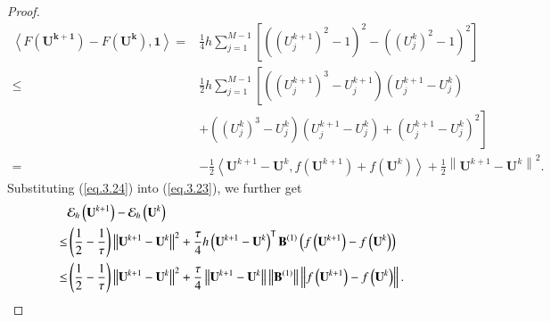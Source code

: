 \documentclass{siamart171218}
\numberwithin{theorem}{section}
\numberwithin{equation}{section}
\begin{document}
\begin{proof}
\begin{equation}
\begin{aligned}\displaystyle
\left<
F\left(\mathbf{U^{k+1}}\right)-
F\left(\mathbf{U^{k}}\right),\mathbf{1}\right>
=&\frac{1}{4}h\sum_{j=1}^{M-1}\left[
\left(\left(U^{k+1}_j\right)^2-
1\right)^2-\left(\left(U^{k}_j\right)^2-
1\right)^2
\right]
\\
\leq&\frac{1}{2}h\sum_{j=1}^{M-1}\left[
\left(\left(U^{k+1}_j\right)^3-
U^{k+1}_j\right)\left(U^{k+1}_j-
U^{k}_j\right)\right.\\&\left.
+\left(\left(U^{k}_j\right)^3-
U^{k}_j\right)\left(U^{k+1}_j-
U^{k}_j\right)
+\left(U^{k+1}_j-
U^{k}_j\right)^2
\right]\\
=&-\frac{1}{2}\left<\mathbf{U}^{k+1}-\mathbf{U}^k,
f\left(\mathbf{U}^{k+1}\right)+f\left(\mathbf{U}^{k}\right)\right>
+\frac{1}{2}\left\|\mathbf{U}^{k+1}-
\mathbf{U}^{k}\right\|^2.
\end{aligned}
\end{equation}
Substituting (\ref{eq.3.24}) into (\ref{eq.3.23}), we further get
 \begin{equation}\label{eq.3.25}
\begin{aligned}\displaystyle
&{\mathcal{E}}_h\left(\mathbf{U}^{k+1}\right)-{\mathcal{E}}_h\left(\mathbf{U}^k\right)\\
\leq&
\left(\frac{1}{2}-\frac{1}{\tau}\right)\left\|\mathbf{U}^{k+1}-\mathbf{U}^k\right\|^2
+\frac{\tau}{4} h\left(\mathbf{U}^{k+1}
-\mathbf{U}^k\right)^{\mathsf{T}}\mathbf{B}^{(1)}\left(
 f\left(\mathbf{U}^{k+1}\right)- f\left(\mathbf{U}^{k}\right)\right) \\
 \leq&
\left(\frac{1}{2}-\frac{1}{\tau}\right)\left\|\mathbf{U}^{k+1}-\mathbf{U}^k\right\|^2
+\frac{\tau}{4} \left\|\mathbf{U}^{k+1}
-\mathbf{U}^k\right\|\left\|\mathbf{B}^{(1)}\right\|\left\|
 f\left(\mathbf{U}^{k+1}\right)- f\left(\mathbf{U}^{k}\right)\right\|.
\end{aligned}
\end{equation}


\end{proof}
\end{document}
